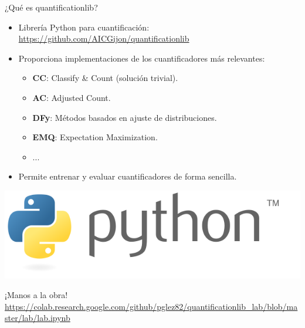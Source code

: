 \documentclass{beamer}
\begin{document}
\begin{frame}{¿Qué es quantificationlib?}
\begin{itemize}
    \item Librería Python para cuantificación: \url{https://github.com/AICGijon/quantificationlib}
    \item Proporciona implementaciones de los cuantificadores más relevantes:
    \begin{itemize}
        \item \textbf{CC}: Classify \& Count (solución trivial).
        \item \textbf{AC}: Adjusted Count.
        \item \textbf{DFy}: Métodos basados en ajuste de distribuciones.
        \item \textbf{EMQ}: Expectation Maximization.
        \item ...
    \end{itemize}
    \item Permite entrenar y evaluar cuantificadores de forma sencilla.
\end{itemize}
\centering
\vspace{0.5cm}
\includegraphics[width=0.6\linewidth]{images/python.png}
\end{frame}

\begin{frame}{¡Manos a la obra!}
\centering
\Large
\url{https://colab.research.google.com/github/pglez82/quantificationlib_lab/blob/master/lab/lab.ipynb}
\end{frame}
\end{document}
